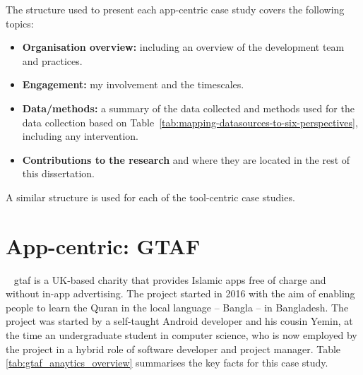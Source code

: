 The structure used to present each app-centric case study covers the following topics:
\begin{itemize}
    \itemsep0em
    \item \textbf{Organisation overview:} including an overview of the development team and practices.
    \item \textbf{Engagement:} my involvement and the timescales.
    \item \textbf{Data/methods:} a summary of the data collected and methods used for the data collection based on Table~\ref{tab:mapping-datasources-to-six-perspectives}, including any intervention.
    \item \textbf{Contributions to the research} and where they are located in the rest of this dissertation.
\end{itemize}
A similar structure is used for each of the tool-centric case studies. 
\clearpage




\section{App-centric: GTAF}~\label{case-study-overview-gtaf}
\Acrfull{gtaf} is a UK-based charity that provides Islamic apps free of charge and without in-app advertising. The project started in 2016 with the aim of enabling people to learn the Quran in the local language -- Bangla -- in Bangladesh. The project was started by a self-taught Android developer and his cousin Yemin, at the time an undergraduate student in computer science, who is now employed by the project in a hybrid role of software developer and project manager. Table \ref{tab:gtaf_anaytics_overview} summarises the key facts for this case study.


